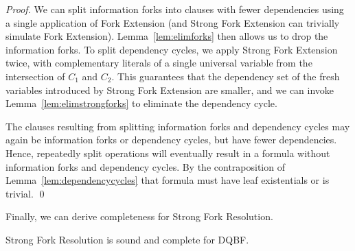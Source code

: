 \documentclass{svjour3}
\newcommand{\dep}{\mathit{dep}}
\begin{document}
\begin{proof}
We can split information forks into clauses with fewer dependencies using a single application of Fork Extension (and Strong Fork Extension can trivially simulate Fork Extension).
Lemma~\ref{lem:elimforks} then allows us to drop the information forks.
To split dependency cycles, we apply Strong Fork Extension twice, with complementary literals of a single universal variable from the intersection of $C_1$ and $C_2$.
This guarantees that the dependency set of the fresh variables introduced by Strong Fork Extension are smaller, and we can invoke Lemma~\ref{lem:elimstrongforks} to eliminate the dependency cycle.

The clauses resulting from splitting information forks and dependency cycles may again be information forks or dependency cycles, but have fewer dependencies.
Hence, repeatedly split operations will eventually result in a formula without information forks and dependency cycles.
By the contraposition of Lemma~\ref{lem:dependencycycles} that formula must have leaf existentials or is trivial.
\qed
\end{proof}

Finally, we can derive completeness for Strong Fork Resolution.




\begin{theorem}  \label{thm:strongsoundandcomplete}
  Strong Fork Resolution is sound and complete for DQBF.
\end{theorem}
\end{document}
